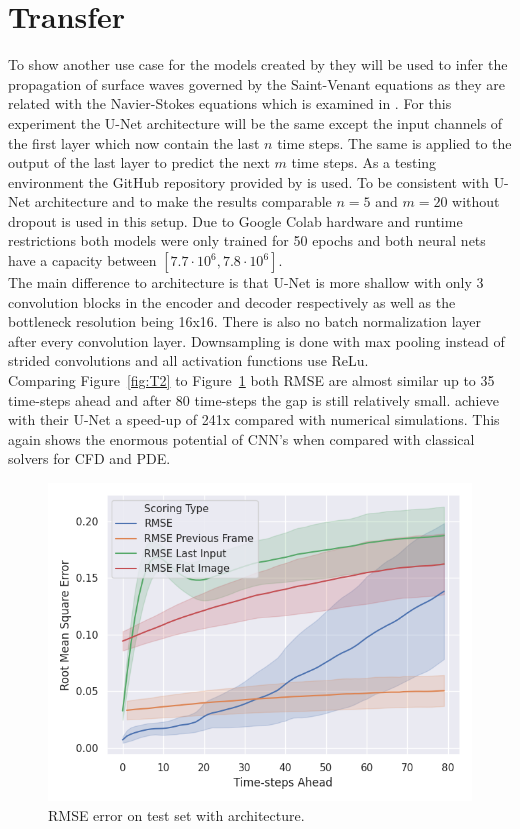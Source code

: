 \documentclass[acmtog]{techreportacmart}
\begin{document}
\section{Transfer}
To show another use case for the models created by \cite{Thuerey20} they will be used to infer 
the propagation of surface waves governed by the Saint-Venant equations as they are related with 
the Navier-Stokes equations which is examined in \cite{Fotiadis2020}. For this experiment the 
U-Net architecture will be the same except the input channels of the first layer which now contain 
the last $n$ time steps. The same is applied to the output of the last layer to predict the next 
$m$ time steps. As a testing environment the GitHub repository provided by \cite{Fotiadis2020} is 
used. To be consistent with \cite{Fotiadis2020} U-Net architecture and to make the results comparable 
$n=5$ and $m=20$ without dropout is used in this setup. Due to Google Colab hardware and runtime 
restrictions both models were only trained for 50 epochs and both neural nets have a capacity 
between $[7.7 \cdot 10^6, 7.8 \cdot 10^6]$.\\
The main difference to \cite{Thuerey20} architecture is that \cite{Fotiadis2020} U-Net is more 
shallow with only 3 convolution blocks in the encoder and decoder respectively as well as the 
bottleneck resolution being 16x16. There is also no batch normalization layer after every 
convolution layer. Downsampling is done with max pooling instead of strided 
convolutions and all activation functions use ReLu. \\
Comparing Figure~\ref{fig:T2} to Figure~\ref{fig:T1} both RMSE are almost similar up to 35 
time-steps ahead and after 80 time-steps the gap is still relatively small. 
\cite{Fotiadis2020} achieve with their U-Net a speed-up of 241x compared with numerical 
simulations. This again shows the enormous potential of CNN's when compared 
with classical solvers for CFD and PDE.

\begin{figure}[H]
  \includegraphics[width=.4\textwidth]{figures/transfer/DFP_Test_RMSE_Quality_start_15}
  \caption{RMSE error on test set with \cite{Thuerey20} architecture.}
  \label{fig:T1}
\end{figure}
\end{document}
